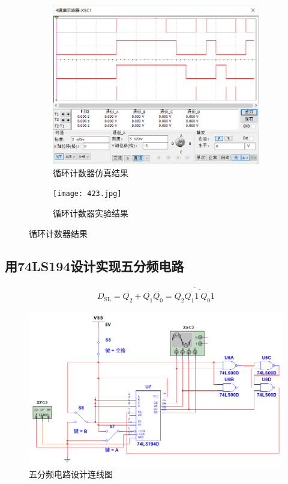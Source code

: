 \documentclass{ctexrep}
\begin{document}
\begin{figure}[htpb]
	\centering
	\begin{subfigure}[htpb]{.45\linewidth}
		\centering
		\includegraphics[width=\linewidth]{422.png}
		\caption{循环计数器仿真结果}
		\label{fig:循环计数器仿真结果}
	\end{subfigure}
	\quad
	\begin{subfigure}[htpb]{.45\linewidth}
		\centering
		\texttt{[image: 423.jpg]}
		\caption{循环计数器实验结果}
		\label{fig:循环计数器实验结果}
	\end{subfigure}
	\caption{循环计数器结果}
	\label{fig:循环计数器结果}
\end{figure}

\newpage

\subsection{用74LS194设计实现五分频电路}%
\label{sub:用74LS194设计实现五分频电路}

\begin{align}
	D_\mathrm{SL}= \overline{Q_2}+ \overline{Q_1} \overline{Q_0}= \overline{Q_2 \overline{ \overline{Q_1 1}~\overline{Q_0 1} } }
\end{align}

\begin{figure}[htpb]
	\centering
	\includegraphics[width=\linewidth]{451.png}
	\caption{五分频电路设计连线图}
	\label{fig:五分频电路设计连线图}
\end{figure}
\end{document}
